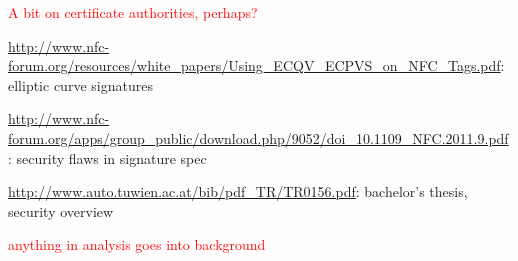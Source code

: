 \documentclass[12pt]{article}
\newcommand\TODO[1]{\textcolor{red}{#1}}
\begin{document}
%
%
%
%

\TODO{A bit on certificate authorities, perhaps?}

\url{http://www.nfc-forum.org/resources/white_papers/Using_ECQV_ECPVS_on_NFC_Tags.pdf}: elliptic curve signatures

\url{http://www.nfc-forum.org/apps/group_public/download.php/9052/doi_10.1109_NFC.2011.9.pdf}: security flaws in signature spec

\url{http://www.auto.tuwien.ac.at/bib/pdf_TR/TR0156.pdf}: bachelor's thesis, security overview

\TODO{anything in analysis goes into background}
\end{document}

